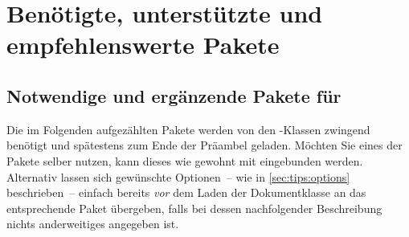 \chapter{%
  Benötigte, unterstützte und empfehlenswerte Pakete%
  \label{sec:packages}%
}
\section{%
  Notwendige und ergänzende Pakete für \TUDScript%
  \label{sec:packages:needed}%
}
%
Die im Folgenden aufgezählten Pakete werden von den \TUDScript-Klassen zwingend 
benötigt und spätestens zum Ende der Präambel geladen. Möchten Sie eines der 
Pakete selber nutzen, kann dieses wie gewohnt mit
 eingebunden werden. 
Alternativ lassen sich gewünschte Optionen~-- wie in \autoref{sec:tips:options} 
beschrieben~-- einfach bereits \emph{vor} dem Laden der Dokumentklasse an das 
entsprechende Paket übergeben, falls bei dessen nachfolgender Beschreibung 
nichts anderweitiges angegeben ist.

